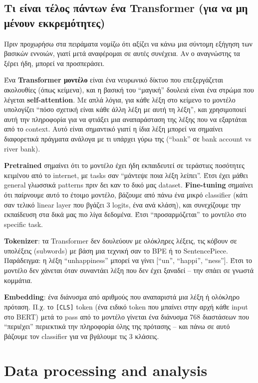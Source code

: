 \documentclass[12pt]{fphw}
\begin{document}
\subsection{Τι είναι τέλος πάντων ένα Transformer (για να μη μένουν εκκρεμότητες)}

Πριν προχωρήσω στα πειράματα νομίζω ότι αξίζει να κάνω μια σύντομη εξήγηση των βασικών εννοιών, γιατί μετά αναφέρομαι σε αυτές συνέχεια. Αν ο αναγνώστης τα ξέρει ήδη, μπορεί να προσπεράσει.

Ένα \textbf{Transformer μοντέλο} είναι ένα νευρωνικό δίκτυο που επεξεργάζεται ακολουθίες (όπως κείμενα), και η βασική του ``μαγική'' δουλειά είναι ένα στρώμα που λέγεται \textbf{self-attention}. Με απλά λόγια, για κάθε λέξη στο κείμενο το μοντέλο υπολογίζει ``πόσο σχετική είναι κάθε άλλη λέξη με αυτή τη λέξη'', και χρησιμοποιεί αυτή την πληροφορία για να φτιάξει μια αναπαράσταση της λέξης που να εξαρτάται από το context. Αυτό είναι σημαντικό γιατί η ίδια λέξη μπορεί να σημαίνει διαφορετικά πράγματα ανάλογα με τι υπάρχει γύρω της (``bank'' σε bank account vs river bank).

\textbf{Pretrained} σημαίνει ότι το μοντέλο έχει ήδη εκπαιδευτεί σε τεράστιες ποσότητες κειμένου από το internet, με tasks σαν ``μάντεψε ποια λέξη λείπει''. Έτσι έχει μάθει general γλωσσικά patterns πριν δει καν το δικό μας dataset. \textbf{Fine-tuning} σημαίνει ότι παίρνουμε αυτό το έτοιμο μοντέλο, βάζουμε από πάνω ένα μικρό classifier (κάτι σαν τελικό linear layer που βγάζει 3 logits, ένα ανά κλάση), και συνεχίζουμε την εκπαίδευση στα δικά μας πιο λίγα δεδομένα. Έτσι ``προσαρμόζεται'' το μοντέλο στο specific task.

\textbf{Tokenizer}: τα Transformer δεν δουλεύουν με ολόκληρες λέξεις, τις κόβουν σε υπολέξεις (subwords) με βάση μια τεχνική σαν το BPE ή το SentencePiece. Παράδειγμα: η λέξη ``unhappiness'' μπορεί να γίνει [``un'', ``happi'', ``ness'']. Έτσι το μοντέλο δεν χάνεται όταν συναντάει λέξη που δεν έχει ξαναδεί -- την σπάει σε γνωστά κομμάτια.

\textbf{Embedding}: ένα διάνυσμα από αριθμούς που αναπαριστά μια λέξη ή ολόκληρο πρόταση. Π.χ. το \texttt{[CLS]} token (ένα ειδικό token που μπαίνει στην αρχή κάθε input στο BERT) μετά το pass από το μοντέλο γίνεται ένα διάνυσμα 768 διαστάσεων που ``περιέχει'' περιεκτικά την πληροφορία όλης της πρότασης -- και πάνω σε αυτό βάζουμε τον classifier για να βγάλουμε τις 3 κλάσεις.

\section{Data processing and analysis}
\end{document}
